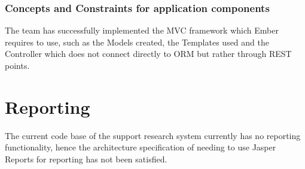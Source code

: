 \documentclass[a4paper,10pt]{article}
\begin{document}
    \subsubsection{Concepts and Constraints for application components}
      The team has successfully implemented the MVC framework which Ember requires to use, such as the Models created, the Templates used and the Controller which does not connect directly to ORM but rather through REST points.

\section{Reporting}
The current code base of the support research system currently has no reporting functionality, hence the architecture specification of needing to use Jasper Reports for reporting has not been satisfied.
\end{document}
